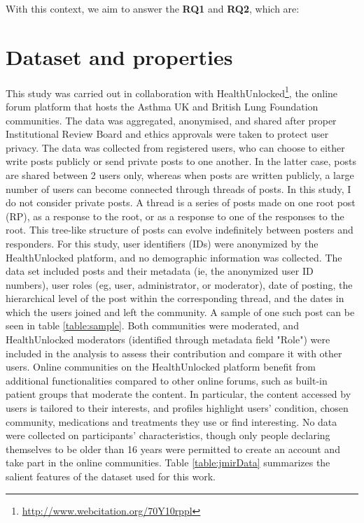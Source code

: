 With this context, we aim to answer the \textbf{RQ1} and \textbf{RQ2}, which are: 

\noindent{}

\section{Dataset and properties}
\label{sec:dataset}
This study was carried out in collaboration with HealthUnlocked\footnote{\url{http://www.webcitation.org/70Y10rppl}}, the online forum platform that hosts the Asthma UK and British Lung Foundation communities. The data was aggregated, anonymised, and shared after proper Institutional Review Board and ethics approvals were taken to protect user privacy. The data was collected from  registered users, who can choose to either write posts publicly or send private posts to one another. In the latter case, posts are shared between 2 users only, whereas when posts are written publicly, a large number of users can become connected through threads of posts. In this study, I do not consider private posts. 
A thread is a series of posts made on one root post (RP), as a response to the root, or as a response to one of the responses to the root. This tree-like structure of posts can evolve indefinitely between posters and responders. 
For this study, user identifiers (IDs) were anonymized by the HealthUnlocked platform, and no demographic information was collected. 
The data set included posts and their metadata (ie, the anonymized user ID numbers), user roles (eg, user, administrator, or moderator), date of posting, the hierarchical level of the post within the corresponding thread, and the dates in which the users joined and left the community. A sample of one such post can be seen in table \ref{table:sample}. Both communities were moderated, and HealthUnlocked moderators (identified through metadata field "Role") were included in the analysis to assess their contribution and compare it with other users. Online communities on the HealthUnlocked platform benefit from additional functionalities compared to other online forums, such as built-in patient groups that moderate the content. In particular, the content accessed by users is tailored to their interests, and profiles highlight users’ condition, chosen community, medications and treatments they use or find interesting. No data were collected on participants’ characteristics, though only people declaring themselves to be older than 16 years were permitted to create an account and take part in the online communities. Table \ref{table:jmirData} summarizes the salient features of the dataset used for this work. 


